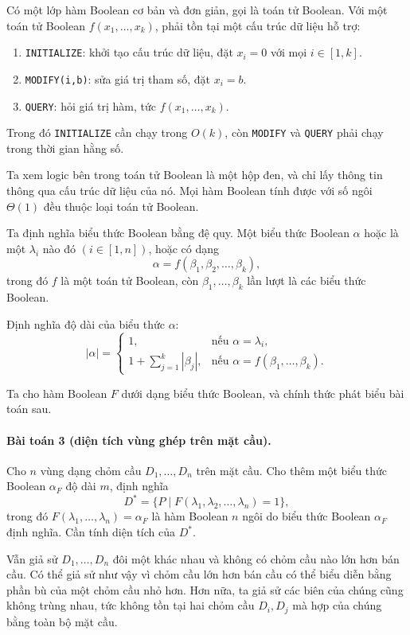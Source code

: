 \documentclass[11pt]{article}
\begin{document}
Có một lớp hàm Boolean cơ bản và đơn giản, gọi là toán tử Boolean. Với một toán
tử Boolean \(f(x_1,\ldots,x_k)\), phải tồn tại một cấu trúc dữ liệu hỗ trợ:

\begin{enumerate}
  \item \texttt{INITIALIZE}: khởi tạo cấu trúc dữ liệu, đặt
  \(x_i=0\) với mọi \(i\in[1,k]\).
  \item \texttt{MODIFY(i,b)}: sửa giá trị tham số, đặt \(x_i=b\).
  \item \texttt{QUERY}: hỏi giá trị hàm, tức \(f(x_1,\ldots,x_k)\).
\end{enumerate}

Trong đó \texttt{INITIALIZE} cần chạy trong \(O(k)\), còn \texttt{MODIFY} và
\texttt{QUERY} phải chạy trong thời gian hằng số.

Ta xem logic bên trong toán tử Boolean là một hộp đen, và chỉ lấy thông tin
thông qua cấu trúc dữ liệu của nó. Mọi hàm Boolean tính được với số ngôi
\(\Theta(1)\) đều thuộc loại toán tử Boolean.

Ta định nghĩa biểu thức Boolean bằng đệ quy. Một biểu thức Boolean \(\alpha\)
hoặc là một \(\lambda_i\) nào đó \((i\in[1,n])\), hoặc có dạng
\[
  \alpha=f(\beta_1,\beta_2,\ldots,\beta_k),
\]
trong đó \(f\) là một toán tử Boolean, còn \(\beta_1,\ldots,\beta_k\) lần lượt
là các biểu thức Boolean.

Định nghĩa độ dài của biểu thức \(\alpha\):
\[
|\alpha|=
\begin{cases}
1, & \text{nếu }\alpha=\lambda_i,\\
1+\displaystyle\sum_{j=1}^{k}|\beta_j|,
& \text{nếu }\alpha=f(\beta_1,\ldots,\beta_k).
\end{cases}
\]

Ta cho hàm Boolean \(F\) dưới dạng biểu thức Boolean, và chính thức phát biểu
bài toán sau.

\paragraph{Bài toán 3 (diện tích vùng ghép trên mặt cầu).}
Cho \(n\) vùng dạng chỏm cầu \(D_1,\ldots,D_n\) trên mặt cầu. Cho thêm một biểu
thức Boolean \(\alpha_F\) độ dài \(m\), định nghĩa
\[
  D^*=\{P\mid F(\lambda_1,\lambda_2,\ldots,\lambda_n)=1\},
\]
trong đó \(F(\lambda_1,\ldots,\lambda_n)=\alpha_F\) là hàm Boolean \(n\) ngôi
do biểu thức Boolean \(\alpha_F\) định nghĩa. Cần tính diện tích của \(D^*\).

Vẫn giả sử \(D_1,\ldots,D_n\) đôi một khác nhau và không có chỏm cầu nào lớn hơn
bán cầu. Có thể giả sử như vậy vì chỏm cầu lớn hơn bán cầu có thể biểu diễn
bằng phần bù của một chỏm cầu nhỏ hơn. Hơn nữa, ta giả sử các biên của chúng
cũng không trùng nhau, tức không tồn tại hai chỏm cầu \(D_i,D_j\) mà hợp của
chúng bằng toàn bộ mặt cầu.
\end{document}
